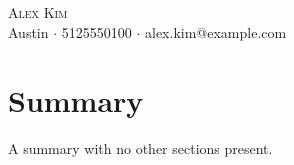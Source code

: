 \documentclass[letterpaper,11pt]{article}
\begin{document}
\begin{center}
{\Huge \scshape Alex Kim} \\ \vspace{5pt}
\small Austin $\cdot$ 5125550100 $\cdot$ alex.kim@example.com
\end{center}

\section{Summary}
{\small A summary with no other sections present.}
\end{document}
